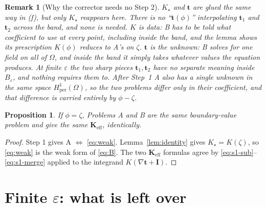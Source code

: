 \documentclass[11pt]{article}
\newtheorem{proposition}{Proposition}
\newtheorem{remark}{Remark}
\newcommand{\Om}{\Omega}
\newcommand{\bt}{\mathbf t}
\newcommand{\bI}{\mathbf I}
\newcommand{\Keff}{\mathbf{K}_{\mathrm{eff}}}
\newcommand{\Hper}{H^1_{\mathrm{per}}(\Om)}
\newcommand{\Band}{B_\varepsilon}
\newcommand{\ind}{\zeta}  %
\begin{document}
\begin{remark}[Why the corrector needs no Step 2]
\label{rem:no-tphi}
$K_\star$ and $\bt$ are glued the same way in (f), but only $K_\star$ reappears
here. There is no ``$\bt(\phi)$'' interpolating $\bt_1$ and $\bt_2$ across
the band, and none is needed. $K$ is \emph{data}: B has to be told what
coefficient to use at every point, including inside the band, and the lemma
shows its prescription $K(\phi)$ reduces to A's on $\ind$. $\bt$ is the
\emph{unknown}: B solves for one field on all of $\Om$, and inside the band it
simply takes whatever values the equation produces. At finite $\varepsilon$
the two sharp pieces $\bt_1,\bt_2$ have no separate meaning inside $\Band$, and
nothing requires them to. After Step~1 A also has a single unknown in the same
space $\Hper$, so the two problems differ only in their coefficient, and that
difference is carried entirely by $\phi-\ind$.
\end{remark}

\begin{proposition}\label{prop:exact}
If $\phi=\ind$, Problems A and B are the same boundary-value problem and give
the same $\Keff$, identically.
\end{proposition}

\begin{proof}
Step 1 gives A $\Leftrightarrow$ \eqref{eq:weak}. Lemma~\ref{lem:identity} gives
$K_\star=K(\ind)$, so \eqref{eq:weak} is the weak form of \eqref{eq:B}. The two
$\Keff$ formulas agree by \eqref{eq:s1-sub}--\eqref{eq:s1-merge} applied to the
integrand $K(\nabla\bt+\bI)$.
\end{proof}

\section{Finite $\varepsilon$: what is left over}
\label{sec:diff}
\end{document}

